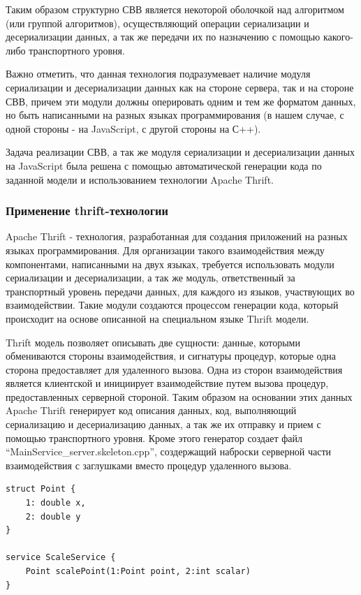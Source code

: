 \documentclass[14pt, a4paper]{extarticle}
\begin{document}
Таким образом структурно СВВ является некоторой оболочкой над алгоритмом (или
группой алгоритмов), осуществляющий операции сериализации и десериализации
данных, а так же передачи их по назначению с помощью какого-либо транспортного
уровня.

Важно отметить, что данная технология подразумевает наличие модуля сериализации
и десериализации данных как на стороне сервера, так и на стороне СВВ, причем
эти модули должны оперировать одним и тем же форматом данных, но быть
написанными на разных языках программирования (в нашем случае, с одной стороны -
на JavaScript, с другой стороны на С++).

Задача реализации СВВ, а так же модуля сериализации и десериализации данных на
JavaScript была решена с помощью автоматической генерации кода по заданной
модели и использованием технологии Apache Thrift.

\subsubsection{Применение thrift-технологии}

Apache Thrift\cite{thrift} - технология, разработанная для создания приложений на
разных языках программирования. Для организации такого взаимодействия между
компонентами, написанными на двух языках, требуется использовать модули
сериализации и десериализации, а так же модуль, ответственный за транспортный
уровень передачи
данных, для каждого из языков, участвующих во взаимодействии. Такие модули
создаются процессом генерации кода, который происходит на основе описанной на
специальном языке Thrift модели.

Thrift модель позволяет описывать две сущности: данные, которыми обмениваются
стороны взаимодействия, и сигнатуры процедур, которые одна сторона
предоставляет для удаленного вызова. Одна из сторон взаимодействия является
клиентской и инициирует взаимодействие путем вызова процедур, предоставленных
серверной стороной. Таким образом на основании этих данных Apache Thrift
генерирует код описания данных, код, выполняющий сериализацию и десериализацию
данных, а так же их отправку и прием с помощью транспортного уровня. Кроме этого
генератор создает файл ``MainService\_server.skeleton.cpp'', создержащий наброски
серверной части взаимодействия с заглушками вместо процедур удаленного вызова.

\begin{lstlisting}[caption={Пример описания модели и сервиса для технологии
Thrift}]
struct Point {
    1: double x,
    2: double y
}

service ScaleService {
    Point scalePoint(1:Point point, 2:int scalar)
}
\end{lstlisting}
\end{document}
